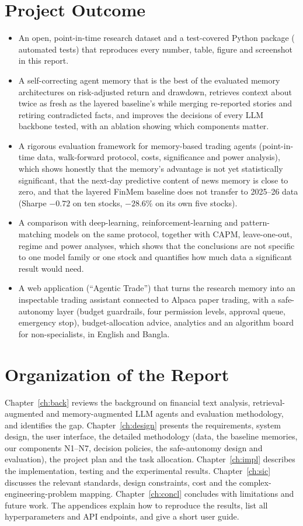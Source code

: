 \section{Project Outcome}
\begin{itemize}
  \item An open, point-in-time research dataset and a test-covered Python package (\testcount{} automated tests) that reproduces every number, table, figure and screenshot in this report.
  \item A self-correcting agent memory that is the best of the evaluated memory architectures on risk-adjusted return and drawdown, retrieves context about twice as fresh as the layered baseline's while merging re-reported stories and retiring contradicted facts, and improves the decisions of every LLM backbone tested, with an ablation showing which components matter.
  \item A rigorous evaluation framework for memory-based trading agents (point-in-time data, walk-forward protocol, costs, significance and power analysis), which shows honestly that the memory's advantage is not yet statistically significant, that the next-day predictive content of news memory is close to zero, and that the layered FinMem baseline does not transfer to 2025--26 data (Sharpe $-0.72$ on ten stocks, $-28.6\%$ on its own five stocks).
  \item A comparison with deep-learning, reinforcement-learning and pattern-matching models on the same protocol, together with CAPM, leave-one-out, regime and power analyses, which shows that the conclusions are not specific to one model family or one stock and quantifies how much data a significant result would need.
  \item A web application (``Agentic Trade'') that turns the research memory into an inspectable trading assistant connected to Alpaca paper trading, with a safe-autonomy layer (budget guardrails, four permission levels, approval queue, emergency stop), budget-allocation advice, analytics and an algorithm board for non-specialists, in English and Bangla.
\end{itemize}

\section{Organization of the Report}
Chapter~\ref{ch:back} reviews the background on financial text analysis, retrieval-augmented and memory-augmented LLM agents and evaluation methodology, and identifies the gap. Chapter~\ref{ch:design} presents the requirements, system design, the user interface, the detailed methodology (data, the baseline memories, our components N1--N7, decision policies, the safe-autonomy design and evaluation), the project plan and the task allocation. Chapter~\ref{ch:impl} describes the implementation, testing and the experimental results. Chapter~\ref{ch:sic} discusses the relevant standards, design constraints, cost and the complex-engineering-problem mapping. Chapter~\ref{ch:concl} concludes with limitations and future work. The appendices explain how to reproduce the results, list all hyperparameters and API endpoints, and give a short user guide.
